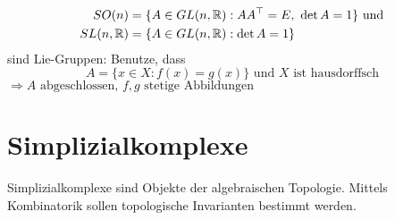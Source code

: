 \begin{example}
  \
  \begin{align*}
    SO(n) &= \{ A \in GL(n, \mathbb{R}) : AA^\top = E, \ \det A = 1 \} \text{ und} \\
    SL(n, \mathbb{R}) &= \{ A \in GL(n, \mathbb{R}) : \det A = 1 \}
  \end{align*}
  sind Lie-Gruppen: Benutze, dass
  \begin{equation*}
    A = \{ x \in X : f(x) = g(x) \} \text{ und } X \text{ ist hausdorffsch}
  \end{equation*}
  $ \Rightarrow A \text{ abgeschlossen, } f, g \text{ stetige Abbildungen} $
\end{example}

\section{Simplizialkomplexe}

Simplizialkomplexe sind Objekte der algebraischen Topologie. Mittels Kombinatorik sollen topologische Invarianten bestimmt werden.